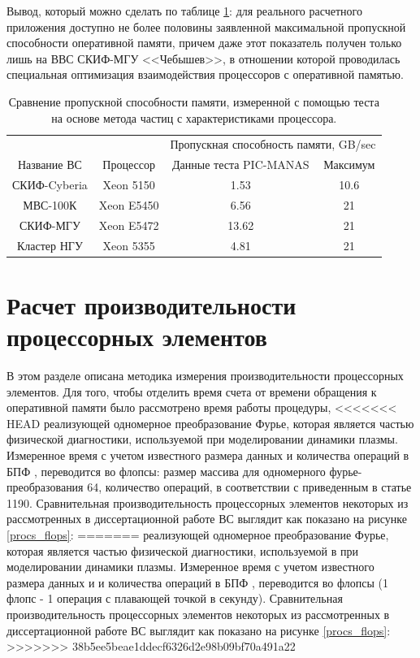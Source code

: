 Вывод, который можно сделать по таблице \ref{PIC_vs_PROC_RAM}: для реального расчетного приложения доступно не более половины заявленной максимальной пропускной способности оперативной памяти, причем даже этот показатель получен только лишь на ВВС СКИФ-МГУ <<Чебышев>>, в отношении которой проводилась специальная оптимизация взаимодействия процессоров с оперативной памятью.

\begin{table}[ht]
\caption{Сравнение пропускной способности памяти, измеренной с помощью теста на основе метода частиц с характеристиками процессора.}
\label{PIC_vs_PROC_RAM}
\begin{tabular}{|c|c|c|c|}
	\hline
             &            & \multicolumn{2}{|c|}{Пропускная способность памяти, GB/sec} \\ \cline{3-4}  	
Название ВС  & Процессор  & Данные теста PIC-MANAS & Максимум \\ \hline
СКИФ-Cyberia & Xeon 5150  &     1.53           & 10.6     \\ \hline
МВС-100К     & Xeon E5450 &     6.56           & 21       \\ \hline 
СКИФ-МГУ     & Xeon E5472 &     13.62          & 21       \\ \hline     
Кластер НГУ  & Xeon 5355  &     4.81           & 21       \\ \hline
\end{tabular}	
\end{table}

\section{Расчет производительности процессорных элементов}
\label{calc_PE}
В этом разделе описана методика измерения производительности процессорных элементов.
Для того, чтобы отделить время счета от времени обращения к оперативной памяти было рассмотрено время работы процедуры,
<<<<<<< HEAD
реализующей одномерное преобразование Фурье, которая является частью физической диагностики, используемой при моделировании динамики плазмы. Измеренное время с учетом известного размера данных и количества операций в БПФ \cite{FFT_OVS}, переводится во флопсы: размер массива для одномерного фурье-преобразования 64, количество операций, в соответствии с приведенным в статье \cite{FFT_OVS} 1190. Сравнительная производительность процессорных элементов некоторых из рассмотренных в диссертационной работе ВС выглядит как показано на рисунке  \ref{procs_flops}:
=======
реализующей одномерное преобразование Фурье, которая является частью физической диагностики, используемой в при моделировании динамики плазмы. Измеренное время с учетом известного размера данных и и количества операций в БПФ , переводится во флопсы (1 флопс - 1 операция с плавающей точкой в секунду). Сравнительная производительность процессорных элементов некоторых из рассмотренных в диссертационной работе ВС выглядит как показано на рисунке  \ref{procs_flops}:
>>>>>>> 38b5ee5beae1ddecf6326d2e98b09bf70a491a22

